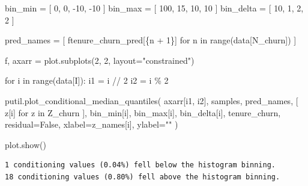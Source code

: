 \documentclass[
  letterpaper,
  DIV=11,
  numbers=noendperiod]{scrartcl}
\newenvironment{Shaded}{\begin{snugshade}}{\end{snugshade}}
\newcommand{\BuiltInTok}[1]{\textcolor[rgb]{0.00,0.23,0.31}{#1}}
\newcommand{\ControlFlowTok}[1]{\textcolor[rgb]{0.00,0.23,0.31}{#1}}
\newcommand{\DecValTok}[1]{\textcolor[rgb]{0.68,0.00,0.00}{#1}}
\newcommand{\KeywordTok}[1]{\textcolor[rgb]{0.00,0.23,0.31}{#1}}
\newcommand{\NormalTok}[1]{\textcolor[rgb]{0.00,0.23,0.31}{#1}}
\newcommand{\OperatorTok}[1]{\textcolor[rgb]{0.37,0.37,0.37}{#1}}
\newcommand{\SpecialCharTok}[1]{\textcolor[rgb]{0.37,0.37,0.37}{#1}}
\newcommand{\SpecialStringTok}[1]{\textcolor[rgb]{0.13,0.47,0.30}{#1}}
\newcommand{\StringTok}[1]{\textcolor[rgb]{0.13,0.47,0.30}{#1}}
\newcommand{\VariableTok}[1]{\textcolor[rgb]{0.07,0.07,0.07}{#1}}
\begin{document}
\begin{Shaded}
\begin{Highlighting}[]
\NormalTok{bin\_min }\OperatorTok{=}\NormalTok{ [ }\DecValTok{0}\NormalTok{, }\DecValTok{0}\NormalTok{, }\OperatorTok{{-}}\DecValTok{10}\NormalTok{, }\OperatorTok{{-}}\DecValTok{10}\NormalTok{ ]}
\NormalTok{bin\_max }\OperatorTok{=}\NormalTok{ [ }\DecValTok{100}\NormalTok{, }\DecValTok{15}\NormalTok{, }\DecValTok{10}\NormalTok{, }\DecValTok{10}\NormalTok{ ]}
\NormalTok{bin\_delta }\OperatorTok{=}\NormalTok{ [ }\DecValTok{10}\NormalTok{, }\DecValTok{1}\NormalTok{, }\DecValTok{2}\NormalTok{, }\DecValTok{2}\NormalTok{ ]}

\NormalTok{pred\_names }\OperatorTok{=}\NormalTok{ [ }\SpecialStringTok{f\textquotesingle{}tenure\_churn\_pred[}\SpecialCharTok{\{}\NormalTok{n }\OperatorTok{+} \DecValTok{1}\SpecialCharTok{\}}\SpecialStringTok{]\textquotesingle{}}
               \ControlFlowTok{for}\NormalTok{ n }\KeywordTok{in} \BuiltInTok{range}\NormalTok{(data[}\StringTok{\textquotesingle{}N\_churn\textquotesingle{}}\NormalTok{]) ]}

\NormalTok{f, axarr }\OperatorTok{=}\NormalTok{ plot.subplots(}\DecValTok{2}\NormalTok{, }\DecValTok{2}\NormalTok{, layout}\OperatorTok{=}\StringTok{"constrained"}\NormalTok{)}

\ControlFlowTok{for}\NormalTok{ i }\KeywordTok{in} \BuiltInTok{range}\NormalTok{(data[}\StringTok{\textquotesingle{}I\textquotesingle{}}\NormalTok{]):}
\NormalTok{  i1 }\OperatorTok{=}\NormalTok{ i }\OperatorTok{//} \DecValTok{2}
\NormalTok{  i2 }\OperatorTok{=}\NormalTok{ i }\OperatorTok{\%} \DecValTok{2}

\NormalTok{  putil.plot\_conditional\_median\_quantiles(}
\NormalTok{    axarr[i1, i2], samples, pred\_names,}
\NormalTok{    [ z[i] }\ControlFlowTok{for}\NormalTok{ z }\KeywordTok{in}\NormalTok{ Z\_churn ],}
\NormalTok{    bin\_min[i], bin\_max[i], bin\_delta[i],}
\NormalTok{    tenure\_churn, residual}\OperatorTok{=}\VariableTok{False}\NormalTok{,}
\NormalTok{    xlabel}\OperatorTok{=}\NormalTok{z\_names[i], ylabel}\OperatorTok{=}\StringTok{""}
\NormalTok{  )}

\NormalTok{plot.show()}
\end{Highlighting}
\end{Shaded}

\begin{verbatim}
1 conditioning values (0.04%) fell below the histogram binning.
18 conditioning values (0.80%) fell above the histogram binning.
\end{verbatim}
\end{document}
